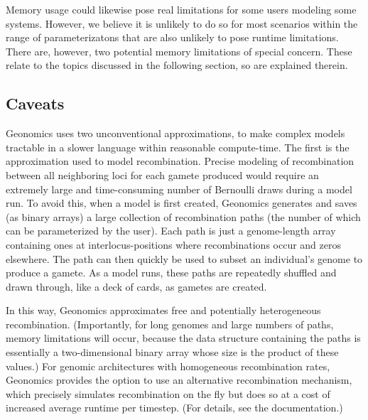 ﻿\documentclass{article}
\begin{document}
Memory usage could likewise pose real limitations for some users modeling some systems.
However, we believe it is unlikely to do so for most scenarios within the range
of parameterizatons that are also unlikely to pose runtime limitations.
There are, however, two potential memory limitations of special concern.
These relate to the topics discussed in the following section, so are explained therein.


\subsection{Caveats}
Geonomics uses two unconventional approximations, to make
complex models tractable in a slower language within reasonable compute-time.
The first is the approximation used to model recombination.
Precise modeling of recombination between all neighboring loci for each gamete produced
would require an extremely large and time-consuming number of Bernoulli draws during a model run.
To avoid this, when a model is first created, Geonomics generates and saves
(as binary arrays) a large collection of recombination paths (the number of which can
be parameterized by the user). Each path is just a genome-length array containing ones
at interlocus-positions where recombinations occur and zeros elsewhere.
The path can then quickly be used to subset an individual's genome to produce a gamete.
As a model runs, these paths are repeatedly shuffled and drawn through, like a deck of cards,
as gametes are created.

In this way, Geonomics approximates free and potentially heterogeneous recombination.
(Importantly, for long genomes and large numbers of paths, memory limitations will occur,
because the data structure containing the paths is essentially a two-dimensional
binary array whose size is the product of these values.)
For genomic architectures with homogeneous recombination rates,
Geonomics provides the option to use an alternative recombination mechanism,
which precisely simulates recombination on the fly but does so at a cost of increased
average runtime per timestep. (For details, see the documentation.)
\end{document}
